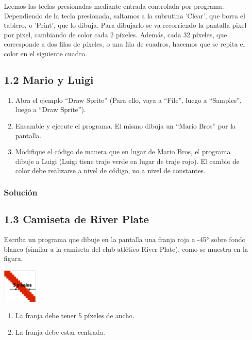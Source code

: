 \documentclass{article}
\begin{document}
Leemos las teclas presionadas mediante entrada controlada por programa. Dependiendo de la tecla presionada, saltamos a la subrutina 'Clear', que borra el tablero, o 'Print', que lo dibuja. Para dibujarlo se va recorriendo la pantalla pixel por pixel, cambiando de color cada 2 píxeles. Además, cada 32 píxeles, que corresponde a dos filas de píxeles, o una fila de cuadros, hacemos que se repita el color en el siguiente cuadro.


\subsection*{1.2 Mario y Luigi}

\begin{enumerate}[label=\alph*)]
    \item Abra el ejemplo “Draw Sprite” (Para ello, vaya a “File”, luego a “Samples”, luego a “Draw Sprite”).
    \item Ensamble y ejecute el programa. El mismo dibuja un “Mario Bros” por la pantalla.
    \item Modifique el código de manera que en lugar de Mario Bros, el programa dibuje a Luigi (Luigi tiene traje verde en lugar de traje rojo). El cambio de color debe realizarse a nivel de código, no a nivel de constantes.
\end{enumerate}

\subsubsection*{Solución}


\subsection*{1.3 Camiseta de River Plate}

Escriba un programa que dibuje en la pantalla una franja roja a -45° sobre fondo blanco (similar a la camiseta del club atlético River Plate), como se muestra en la figura.

\begin{center}
    \includegraphics*[width=66px]{./img/ej1.3.png}
\end{center}

\begin{enumerate}[label=\alph*)]
    \item La franja debe tener 5 píxeles de ancho.
    \item La franja debe estar centrada.
\end{enumerate}
\end{document}
